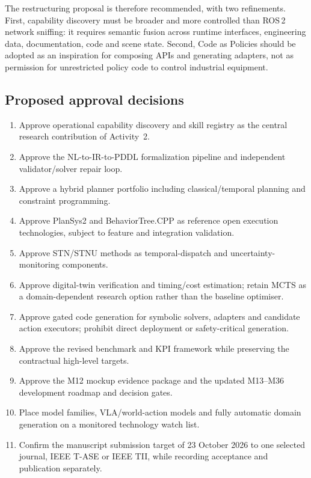 \documentclass{plan4ari_report}
\begin{document}
The restructuring proposal is therefore recommended, with two refinements. First, capability discovery must be broader and more controlled than ROS\,2 network sniffing: it requires semantic fusion across runtime interfaces, engineering data, documentation, code and scene state. Second, Code as Policies should be adopted as an inspiration for composing APIs and generating adapters, not as permission for unrestricted policy code to control industrial equipment.

\subsection{Proposed approval decisions}
\begin{enumerate}
\item Approve operational capability discovery and skill registry as the central research contribution of Activity~2.
\item Approve the NL-to-IR-to-PDDL formalization pipeline and independent validator/solver repair loop.
\item Approve a hybrid planner portfolio including classical/temporal planning and constraint programming.
\item Approve PlanSys2 and BehaviorTree.CPP as reference open execution technologies, subject to feature and integration validation.
\item Approve STN/STNU methods as temporal-dispatch and uncertainty-monitoring components.
\item Approve digital-twin verification and timing/cost estimation; retain MCTS as a domain-dependent research option rather than the baseline optimiser.
\item Approve gated code generation for symbolic solvers, adapters and candidate action executors; prohibit direct deployment or safety-critical generation.
\item Approve the revised benchmark and KPI framework while preserving the contractual high-level targets.
\item Approve the M12 mockup evidence package and the updated M13--M36 development roadmap and decision gates.
\item Place model families, VLA/world-action models and fully automatic domain generation on a monitored technology watch list.
\item Confirm the manuscript submission target of 23 October 2026 to one selected journal, IEEE T-ASE or IEEE TII, while recording acceptance and publication separately.
\end{enumerate}
\end{document}
